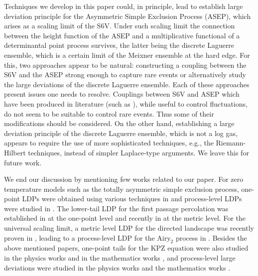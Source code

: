 \documentclass[reqno,11pt]{amsart}
\numberwithin{equation}{section}
\theoremstyle{definition}
\begin{document}
Techniques we develop in this paper could, in principle, lead to establish large deviation principle for the Asymmetric Simple Exclusion Process (ASEP), which arises as a scaling limit of the S6V. Under such scaling limit the connection between the height function of the ASEP and a multiplicative functional of a determinantal point process survives, the latter being the discrete Laguerre ensemble, which is a certain limit of the Meixner ensemble at the hard edge. For this, two approaches appear to be natural: constructing a coupling between the S6V and the ASEP strong enough to capture rare events or alternatively study the large deviations of the discrete Laguerre ensemble. Each of these approaches present issues one needs to resolve. Couplings between S6V and ASEP which have been produced in literature (such as \cite{Aggarwal_6v_to_ASEP,ach24}), while useful to control fluctuations, do not seem to be suitable to control rare events. Thus some of their modifications should be considered. On the other hand, establishing a large deviation principle of the discrete Laguerre ensemble, which is not a log gas, appears to require the use of more sophisticated techniques, e.g., the Riemann-Hilbert techniques, instead of simpler Laplace-type arguments. We leave this for future work.



We end our discussion by mentioning few works related to our paper. For zero temperature models such as the totally asymmetric simple exclusion process, one-point LDPs were obtained using various techniques in \cite{logan_shepp1977variational,sep98a,seppalainen_98_increasing,deuschel_zeitouni_1999,johansson2000shape} and process-level LDPs were studied in \cite{jen00,var04,ot19,qt21}. The lower-tail LDP for the first passage percolation was established in \cite{basu2021upper} at the one-point level and recently in \cite{verges2024large} at the metric level. For the universal scaling limit, a metric level LDP for the directed landscape was recently proven in \cite{das2024upper}, leading to a process-level LDP for the $\mathrm{Airy}_2$ process in \cite{das2024solving}. Besides the above mentioned papers, one-point tails for the KPZ equation were also studied in the physics works \cite{ledoussal16long,ledoussal16short,krajenbrink17short,sasorov2017large,corwin2018coulomb,krajenbrink18half,krajenbrink18simple,krajenbrink2018systematic} and in the mathematics works \cite{dt21,kim21,corwin20general,gl20}, and process-level large deviations were studied in the physics works \cite{kolokolov07,kolokolov09,meerson16,meerson17,meerson18,kamenev16,hartmann19,krajenbrink21,krajenbrink22flat,krajenbrink23} and the mathematics works \cite{lin21,gaudreaulamarre2023kpz,lin22,ganguly2022sharp,ganguly2023brownian,lin23,tsai2023high}.  
\end{document}
